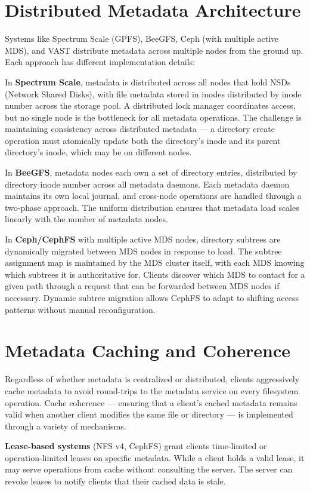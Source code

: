 \section{Distributed Metadata Architecture}
Systems like Spectrum Scale (GPFS), BeeGFS, Ceph (with multiple active MDS), and VAST distribute metadata across multiple nodes from the ground up. Each approach has different implementation details:

In \textbf{Spectrum Scale}, metadata is distributed across all nodes that hold NSDs (Network Shared Disks), with file metadata stored in inodes distributed by inode number across the storage pool. A distributed lock manager coordinates access, but no single node is the bottleneck for all metadata operations. The challenge is maintaining consistency across distributed metadata --- a directory create operation must atomically update both the directory's inode and its parent directory's inode, which may be on different nodes.

In \textbf{BeeGFS}, metadata nodes each own a set of directory entries, distributed by directory inode number across all metadata daemons. Each metadata daemon maintains its own local journal, and cross-node operations are handled through a two-phase approach. The uniform distribution ensures that metadata load scales linearly with the number of metadata nodes.

In \textbf{Ceph/CephFS} with multiple active MDS nodes, directory subtrees are dynamically migrated between MDS nodes in response to load. The subtree assignment map is maintained by the MDS cluster itself, with each MDS knowing which subtrees it is authoritative for. Clients discover which MDS to contact for a given path through a request that can be forwarded between MDS nodes if necessary. Dynamic subtree migration allows CephFS to adapt to shifting access patterns without manual reconfiguration.

\section{Metadata Caching and Coherence}
Regardless of whether metadata is centralized or distributed, clients aggressively cache metadata to avoid round-trips to the metadata service on every filesystem operation. Cache coherence --- ensuring that a client's cached metadata remains valid when another client modifies the same file or directory --- is implemented through a variety of mechanisms.

\textbf{Lease-based systems} (NFS v4, CephFS) grant clients time-limited or operation-limited leases on specific metadata. While a client holds a valid lease, it may serve operations from cache without consulting the server. The server can revoke leases to notify clients that their cached data is stale.


